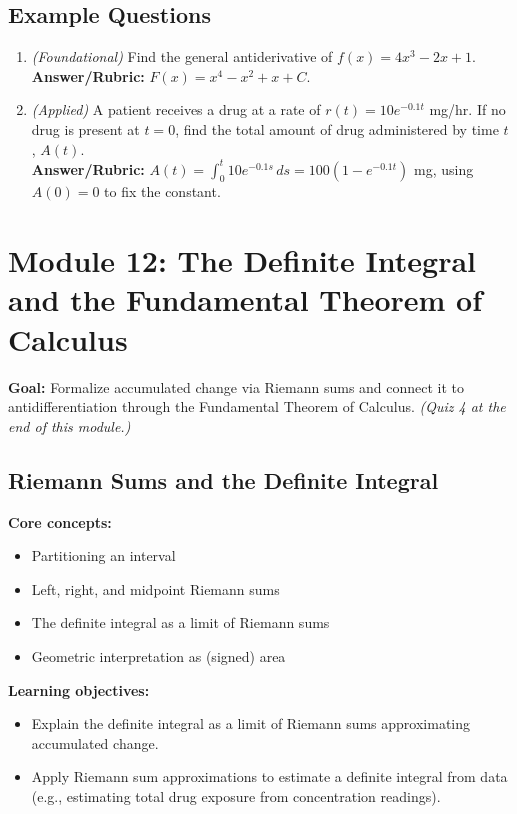 \documentclass{article}
\begin{document}
\subsection*{Example Questions}
\begin{enumerate}[leftmargin=*]
  \item \textit{(Foundational)} Find the general antiderivative of $f(x) = 4x^3 - 2x + 1$. \\
  \textbf{Answer/Rubric:} $F(x) = x^4 - x^2 + x + C$.
  \item \textit{(Applied)} A patient receives a drug at a rate of $r(t) = 10e^{-0.1t}$ mg/hr. If no drug is present at $t=0$, find the total amount of drug administered by time $t$, $A(t)$. \\
  \textbf{Answer/Rubric:} $A(t) = \int_0^t 10e^{-0.1s}\,ds = 100(1-e^{-0.1t})$ mg, using $A(0)=0$ to fix the constant.
\end{enumerate}


\section{Module 12: The Definite Integral and the Fundamental Theorem of Calculus}
\textbf{Goal:} Formalize accumulated change via Riemann sums and connect it to antidifferentiation through the Fundamental Theorem of Calculus. \textit{(Quiz 4 at the end of this module.)}

\subsection{Riemann Sums and the Definite Integral}
\textbf{Core concepts:}
\begin{itemize}[leftmargin=*]
  \item Partitioning an interval
  \item Left, right, and midpoint Riemann sums
  \item The definite integral as a limit of Riemann sums
  \item Geometric interpretation as (signed) area
\end{itemize}
\textbf{Learning objectives:}
\begin{itemize}[leftmargin=*]
  \item Explain the definite integral as a limit of Riemann sums approximating accumulated change.
  \item Apply Riemann sum approximations to estimate a definite integral from data (e.g., estimating total drug exposure from concentration readings).
\end{itemize}
\end{document}
